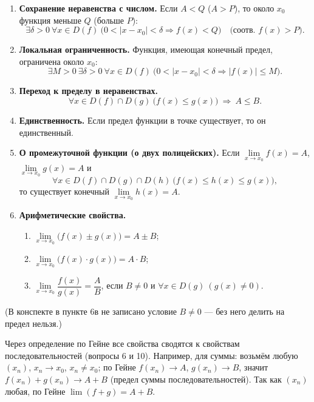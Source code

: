 \documentclass[a4paper,11pt]{article}
\begin{document}
\begin{enumerate}[leftmargin=*]
  \item \textbf{Сохранение неравенства с числом.} Если $A < Q$ ($A > P$), то около $x_0$ функция меньше $Q$ (больше $P$):
    \[
      \exists \delta > 0\ \forall x \in D(f)\ \bigl( 0 < |x - x_0| < \delta \Rightarrow f(x) < Q \bigr)
      \quad \bigl(\text{соотв. } f(x) > P\bigr).
    \]
  \item \textbf{Локальная ограниченность.} Функция, имеющая конечный предел, ограничена около $x_0$:
    \[
      \exists M > 0\ \exists \delta > 0\ \forall x \in D(f)\ \bigl( 0 < |x - x_0| < \delta \Rightarrow |f(x)| \le M \bigr).
    \]
  \item \textbf{Переход к пределу в неравенствах.}
    \[
      \forall x \in D(f) \cap D(g)\ \bigl( f(x) \le g(x) \bigr) \ \Longrightarrow\ A \le B.
    \]
  \item \textbf{Единственность.} Если предел функции в точке существует, то он единственный.
  \item \textbf{О промежуточной функции (о двух полицейских).} Если $\lim\limits_{x \to x_0} f(x) = A$, $\lim\limits_{x \to x_0} g(x) = A$ и
    \[
      \forall x \in D(f) \cap D(g) \cap D(h)\ \bigl( f(x) \le h(x) \le g(x) \bigr),
    \]
    то существует конечный $\lim\limits_{x \to x_0} h(x) = A$.
  \item \textbf{Арифметические свойства.}
    \begin{enumerate}
      \item $\lim\limits_{x \to x_0} \bigl( f(x) \pm g(x) \bigr) = A \pm B$;
      \item $\lim\limits_{x \to x_0} \bigl( f(x) \cdot g(x) \bigr) = A \cdot B$;
      \item $\lim\limits_{x \to x_0} \dfrac{f(x)}{g(x)} = \dfrac{A}{B}$, если $B \ne 0$ и $\forall x \in D(g)\ (g(x) \ne 0)$.
    \end{enumerate}
\end{enumerate}
{\small\textcolor{zamc}{(В конспекте в пункте 6в не записано условие $B \ne 0$ --- без него делить на предел нельзя.)}}

\begin{dop}
Через определение по Гейне все свойства сводятся к свойствам последовательностей (вопросы 6 и 10). Например, для суммы:
возьмём любую $(x_n)$, $x_n \to x_0$, $x_n \ne x_0$; по Гейне $f(x_n) \to A$, $g(x_n) \to B$, значит
$f(x_n) + g(x_n) \to A + B$ (предел суммы последовательностей). Так как $(x_n)$ любая, по Гейне $\lim (f + g) = A + B$.
\end{dop}
\end{document}
